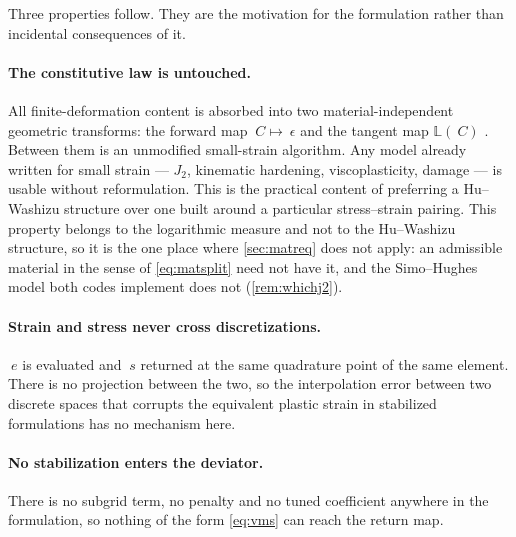 \documentclass{article}
\newcommand{\C}{~C}
\newcommand{\eps}{~\epsilon}
\newcommand{\edev}{~e}
\newcommand{\sdev}{~s}
\theoremstyle{definition}
\theoremstyle{plain}
\begin{document}
Three properties follow. They are the motivation for the formulation rather
than incidental consequences of it.

\paragraph{The constitutive law is untouched.} All finite-deformation content is
absorbed into two material-independent geometric transforms: the forward
map $\C \mapsto \eps$ and the tangent map $\mathbb{L}(\C)$
\cite{Miehe.Apel.Lambrecht:2002}. Between them is an unmodified small-strain
algorithm. Any model already written for small strain --- $J_2$, kinematic
hardening, viscoplasticity, damage --- is usable without reformulation. This is the
practical content of preferring a Hu--Washizu structure over one built around a
particular stress--strain pairing. This property belongs to the
logarithmic measure and not to the Hu--Washizu structure, so it is the one
place where \cref{sec:matreq} does not apply: an admissible material
in the sense of \eqref{eq:matsplit} need not have it, and the Simo--Hughes
model both codes implement does not (\cref{rem:whichj2}).

\paragraph{Strain and stress never cross discretizations.} $\edev$ is evaluated and
$\sdev$ returned at the same quadrature point of the same element. There is no
projection between the two, so the interpolation error between two discrete
spaces that corrupts the equivalent plastic strain in stabilized formulations
has no mechanism here.

\paragraph{No stabilization enters the deviator.} There is no subgrid term, no
penalty and no tuned coefficient anywhere in the formulation, so nothing of the
form \eqref{eq:vms} can reach the return map.
\end{document}
